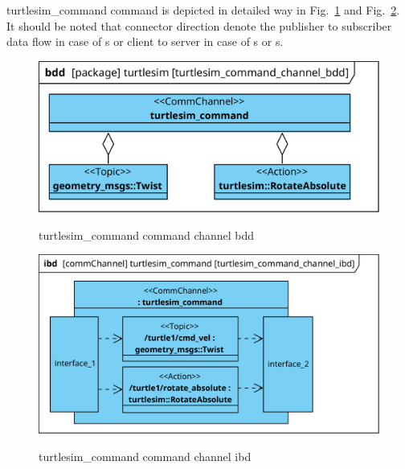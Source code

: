 \documentclass[11pt,oneside,a4paper]{report}
\begin{document}
\textsf{turtlesim\_command command} \stCommChannel{} is depicted in detailed way in Fig.~\ref{fig:turtlesim_command_channel_bdd} and Fig.~\ref{fig:turtlesim_command_channel_ibd}. It should be noted that connector direction denote the publisher to subscriber data flow in case of \stTopic{}s or client to server in case of \stService{}s or \stAction{}s.


\begin{figure}[H]
	\centering
	\begin{center}
		{\includegraphics[scale=1.0]{diagrams/turtlesim_command_channel_bdd.png}}
	\end{center}
	\caption{turtlesim\_command command channel bdd}
	\label{fig:turtlesim_command_channel_bdd}
\end{figure}

\begin{figure}[H]
	\centering
	\begin{center}
		{\includegraphics[scale=1.0]{diagrams/turtlesim_command_channel_ibd.png}}
	\end{center}
	\caption{turtlesim\_command command channel ibd}
	\label{fig:turtlesim_command_channel_ibd}
\end{figure}
			
\pagebreak			
			
\end{document}

